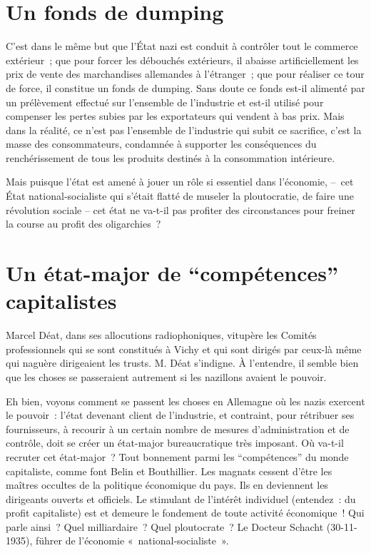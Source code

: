 \documentclass[french,twoside]{book} %
\begin{document}
\section[{Un fonds de dumping}]{Un fonds de dumping}
\noindent C’est dans le même but que l’État nazi est conduit à contrôler tout le commerce extérieur ; que pour forcer les débouchés extérieurs, il abaisse artificiellement les prix de vente des marchandises allemandes à l’étranger ; que pour réaliser ce tour de force, il constitue un fonds de dumping. Sans doute ce fonds est-il alimenté par un prélèvement effectué sur l’ensemble de l’industrie et est-il utilisé pour compenser les pertes subies par les exportateurs qui vendent à bas prix. Mais dans la réalité, ce n’est pas l’ensemble de l’industrie qui subit ce sacrifice, c’est la masse des consommateurs, condamnée à supporter les conséquences du renchérissement de tous les produits destinés à la consommation intérieure.\par
Mais puisque l’état est amené à jouer un rôle si essentiel dans l’économie, – cet État national-socialiste qui s’était flatté de museler la ploutocratie, de faire une révolution sociale – cet état ne va-t-il pas profiter des circonstances pour freiner la course au profit des oligarchies ?
\section[{Un état-major de “compétences” capitalistes}]{Un état-major de “compétences” capitalistes}
\noindent Marcel Déat, dans ses allocutions radiophoniques, vitupère les Comités professionnels qui se sont constitués à Vichy et qui sont dirigés par ceux-là même qui naguère dirigeaient les trusts. M. Déat s’indigne. À l’entendre, il semble bien que les choses se passeraient autrement si les nazillons avaient le pouvoir.\par
Eh bien, voyons comment se passent les choses en Allemagne où les nazis exercent le pouvoir : l’état devenant client de l’industrie, et contraint, pour rétribuer ses fournisseurs, à recourir à un certain nombre de mesures d’administration et de contrôle, doit se créer un état-major bureaucratique très imposant. Où va-t-il recruter cet état-major ? Tout bonnement parmi les “compétences” du monde capitaliste, comme font Belin et Bouthillier. Les magnats cessent d’être les maîtres occultes de la politique économique du pays. Ils en deviennent les dirigeants ouverts et officiels. Le stimulant de l’intérêt individuel (entendez : du profit capitaliste) est et demeure le fondement de toute activité économique ! Qui parle ainsi ? Quel milliardaire ? Quel ploutocrate ? Le Docteur Schacht (30-11-1935), führer de l’économie « national-socialiste ».
\end{document}
